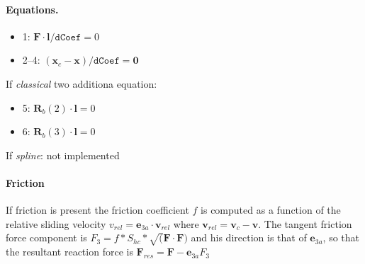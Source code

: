 \documentclass[10pt,fleqn,subeqn]{report}
\newcommand{\T}[1]{\bm{#1}}
\newcommand{\TT}[1]{\bm{#1}}
\begin{document}
\paragraph{Equations.}
\begin{itemize}
\item 1: $\T{F} \cdot \T{l} / \texttt{dCoef}= 0$
\item 2--4: $(\T{x}_c - \T{x}) / \texttt{dCoef} = \T {0}$
\end{itemize}

If \emph{classical} two additiona equation:
\begin{itemize}
\item 5: $\TT{R}_b(2) \cdot \T{l} = 0$
\item 6: $\TT{R}_b(3) \cdot \T{l} = 0$
\end{itemize}

If \emph{spline}: not implemented

\paragraph{Friction}
If friction is present the friction coefficient $f$ is computed as a function of
the relative sliding velocity $v_{rel} = \T{e}_{3a} \cdot \T{v}_{rel}$ where $\T{v}_{rel} = \T{v}_c - \T{v}$.
The tangent friction force component is $F_3 = f * S_{hc} * \sqrt(\T{F}\cdot\T{F})$
and his direction is that of $\T{e}_{3a}$, so that the resultant reaction force is 
$\T{F}_{res} = \T{F} - \T{e}_{3a} F_3$
\end{document}
